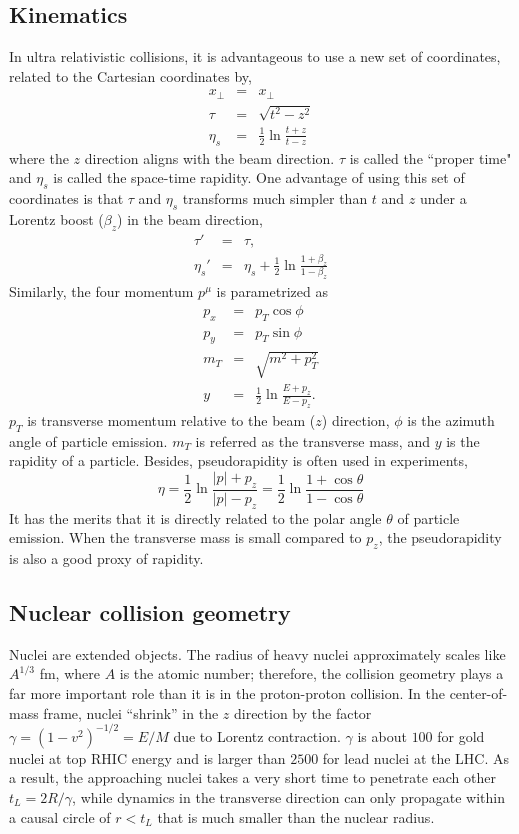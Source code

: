 \subsection{Kinematics}
In ultra relativistic collisions, it is advantageous to use a new set of coordinates, related to the Cartesian coordinates by,
\begin{eqnarray}
x_\perp &=& x_\perp\\
\tau &=& \sqrt{t^2 - z^2}\\
\eta_s &=& \frac{1}{2}\ln\frac{t+z}{t-z}
\end{eqnarray}
where the $z$ direction aligns with the beam direction.
$\tau$ is called the ``proper time" and $\eta_s$ is called the space-time rapidity.
One advantage of using this set of coordinates is that $\tau$ and $\eta_s$ transforms much simpler than $t$ and $z$ under a Lorentz boost ($\beta_z$) in the beam direction,
\begin{eqnarray}
\tau' &=& \tau,\\
\eta_s' &=& \eta_s + \frac{1}{2}\ln\frac{1+\beta_z}{1-\beta_z}
\end{eqnarray}
Similarly, the four momentum $p^\mu$ is parametrized as 
\begin{eqnarray}
p_x &=& p_T\cos\phi\\
p_y &=& p_T\sin\phi\\
m_T &=& \sqrt{m^2 + p_T^2}\\
y &=& \frac{1}{2}\ln\frac{E+p_z}{E-p_z}.
\end{eqnarray}
$p_T$ is transverse momentum relative to the beam ($z$) direction, $\phi$ is the azimuth angle of particle emission. 
$m_T$ is referred as the transverse mass, and $y$ is the rapidity of a particle.
Besides, pseudorapidity is often used in experiments,
\begin{equation}
\eta = \frac{1}{2}\ln\frac{|p|+p_z}{|p|-p_z} = \frac{1}{2}\ln\frac{1+\cos\theta}{1-\cos\theta}
\end{equation}
It has the merits that it is directly related to the polar angle  $\theta$ of particle emission.
When the transverse mass is small compared to $p_z$, the pseudorapidity is also a good proxy of rapidity.

\subsection{Nuclear collision geometry}
Nuclei are extended objects.
The radius of heavy nuclei approximately scales like $A^{1/3}$ fm, where  $A$ is the atomic number; therefore, the collision geometry plays a far more important role than it is in the proton-proton collision.
In the center-of-mass frame,  nuclei ``shrink'' in the $z$ direction by the factor $\gamma = (1-v^2)^{-1/2} = E/M$ due to Lorentz contraction.
$\gamma$ is about $100$ for gold nuclei at top RHIC energy and is larger than $2500$ for lead nuclei at the LHC.
As a result, the approaching nuclei takes a very short time to penetrate each other $t_L = 2R/\gamma$, while dynamics in the transverse direction can only propagate within a causal circle of $r < t_L$ that is much smaller than the nuclear radius.

